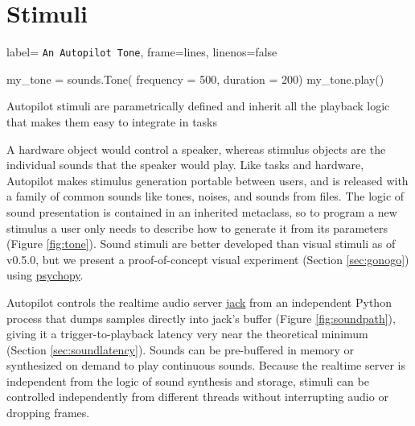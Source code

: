 \section{Stimuli}
\label{sec:stim}

\begin{marginfigure}[0.45cm]
\begin{pythoncode*}{
label= \texttt{An Autopilot Tone},
frame=lines,
linenos=false}

my_tone = sounds.Tone(
    frequency = 500,
    duration  = 200)
my_tone.play()
\end{pythoncode*}
\caption{Autopilot stimuli are parametrically defined and inherit all the playback logic that makes them easy to integrate in tasks}
\label{fig:tone}
\end{marginfigure}

A hardware object would control a speaker, whereas stimulus objects are the individual sounds that the speaker would play. Like tasks and hardware, Autopilot makes stimulus generation portable between users, and is released with a family of common sounds like tones, noises, and sounds from files. The logic of sound presentation is contained in an inherited metaclass, so to program a new stimulus a user only needs to describe how to generate it from its parameters (Figure \ref{fig:tone}).  Sound stimuli are better developed than visual stimuli as of v0.5.0, but we present a proof-of-concept visual experiment (Section \ref{sec:gonogo}) using \href{https://www.psychopy.org/}{psychopy}\citep{peircePsychoPy2ExperimentsBehavior2019}.

Autopilot controls the realtime audio server \href{http://jackaudio.org/}{jack} from an independent Python process that dumps samples directly into jack's buffer (Figure \ref{fig:soundpath}), giving it a trigger-to-playback latency very near the theoretical minimum (Section \ref{sec:soundlatency}). Sounds can be pre-buffered in memory or synthesized on demand to play continuous sounds. Because the realtime server is independent from the logic of sound synthesis and storage, stimuli can be controlled independently from different threads without interrupting audio or dropping frames.

